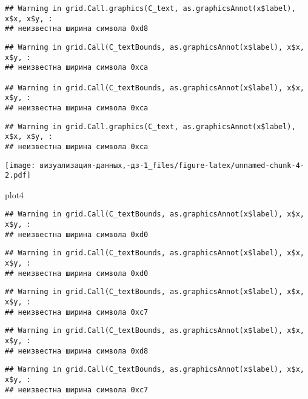 \documentclass[
]{article}
\newenvironment{Shaded}{\begin{snugshade}}{\end{snugshade}}
\newcommand{\NormalTok}[1]{#1}
\begin{document}
\begin{verbatim}
## Warning in grid.Call.graphics(C_text, as.graphicsAnnot(x$label), x$x, x$y, :
## неизвестна ширина символа 0xd8
\end{verbatim}

\begin{verbatim}
## Warning in grid.Call(C_textBounds, as.graphicsAnnot(x$label), x$x, x$y, :
## неизвестна ширина символа 0xca

## Warning in grid.Call(C_textBounds, as.graphicsAnnot(x$label), x$x, x$y, :
## неизвестна ширина символа 0xca
\end{verbatim}

\begin{verbatim}
## Warning in grid.Call.graphics(C_text, as.graphicsAnnot(x$label), x$x, x$y, :
## неизвестна ширина символа 0xca
\end{verbatim}

\texttt{[image: визуализация-данных,-дз-1\_files/figure-latex/unnamed-chunk-4-2.pdf]}

\begin{Shaded}
\begin{Highlighting}[]
\NormalTok{plot4}
\end{Highlighting}
\end{Shaded}

\begin{verbatim}
## Warning in grid.Call(C_textBounds, as.graphicsAnnot(x$label), x$x, x$y, :
## неизвестна ширина символа 0xd0
\end{verbatim}

\begin{verbatim}
## Warning in grid.Call(C_textBounds, as.graphicsAnnot(x$label), x$x, x$y, :
## неизвестна ширина символа 0xd0
\end{verbatim}

\begin{verbatim}
## Warning in grid.Call(C_textBounds, as.graphicsAnnot(x$label), x$x, x$y, :
## неизвестна ширина символа 0xc7
\end{verbatim}

\begin{verbatim}
## Warning in grid.Call(C_textBounds, as.graphicsAnnot(x$label), x$x, x$y, :
## неизвестна ширина символа 0xd8
\end{verbatim}

\begin{verbatim}
## Warning in grid.Call(C_textBounds, as.graphicsAnnot(x$label), x$x, x$y, :
## неизвестна ширина символа 0xc7
\end{verbatim}
\end{document}

